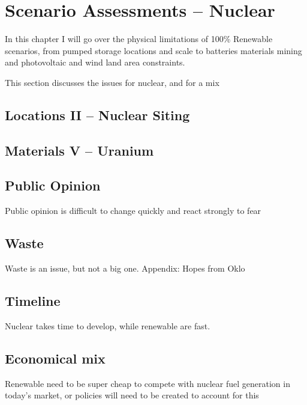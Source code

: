 \setchapterpreamble[u]{\margintoc}
\chapter{Scenario Assessments -- Nuclear}

In this chapter I will go over the physical limitations of 100\% Renewable scenarios, from pumped storage locations and scale to batteries materials mining and photovoltaic and wind land area constraints.

This section discusses the issues for nuclear, and for a mix

\section{Locations II -- Nuclear Siting}

\blindtext

\section{Materials V -- Uranium}

\blindtext

\section{Public Opinion}

Public opinion is difficult to change quickly and react strongly to fear

\blindtext

\section{Waste}

Waste is an issue, but not a big one. Appendix: Hopes from Oklo

\blindtext

\section{Timeline}

Nuclear takes time to develop, while renewable are fast.

\blindtext

\section{Economical mix}

Renewable need to be super cheap to compete with nuclear fuel generation in today's market, or policies will need to be created to account for this

